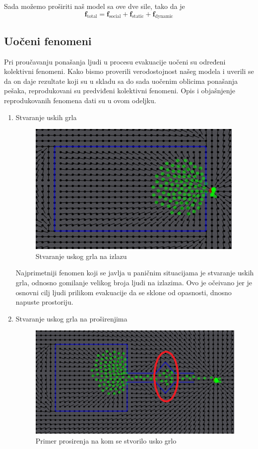 \documentclass[12pt]{article}
\begin{document}
	Sada možemo proširiti naš model sa ove dve sile, tako da je
	$$
		\mathbf f_\text{total} = \mathbf f_\text{social} + \mathbf f_\text{static} + \mathbf f_\text{dynamic}
	$$
	
	     
    \subsection{Uočeni fenomeni}
    Pri proučavanju ponašanja ljudi u procesu evakuacije uočeni su određeni kolektivni fenomeni. Kako bismo proverili verodostojnost našeg modela i uverili se da on daje rezultate koji su u skladu sa do sada uočenim oblicima ponašanja pešaka, reprodukovani su predviđeni kolektivni fenomeni. Opis i objašnjenje reprodukovanih fenomena dati su u ovom odeljku.
\begin{enumerate}
\item Stvaranje uskih grla

\begin{figure}
\centering
\includegraphics{UG} %
\caption{Stvaranje uskog grla na izlazu}
\end{figure}

Najprimetniji fenomen koji se javlja u paničnim situacijama je stvaranje uskih grla, odnosno gomilanje velikog broja ljudi na izlazima. Ovo je očeivano jer je osnovni cilj ljudi prilikom evakuacije da se sklone od opasnosti, dnosno napuste prostoriju.

\item Stvaranje uskog grla na proširenjima

\begin{figure}[hb]
\centering
\includegraphics{Guzva}
\caption{Primer prosirenja na kom se stvorilo usko grlo}
\label{fig:guzva}
\end{figure}


\end{enumerate}
\end{document}
